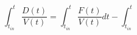 \begin{equation}
\int_{t_{in}}^t \frac{D(t)}{V(t)}=\int_{t_{in}}^t \frac{F(t)}{V(t)} dt - \int_{t_{in}}^t 
\end{equation}